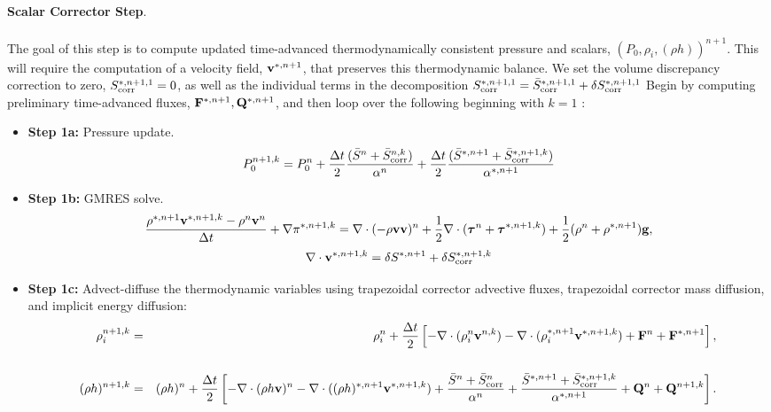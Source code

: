 \documentclass[final]{siamltex}
\def\Fb {{\bf F}}
\def\gb {{\bf g}}
\def\Qb {{\bf Q}}
\def\vb {{\bf v}}
\def\taub   {\boldsymbol{\tau}}
\begin{document}
{\bf Scalar Corrector Step}.\\ \\
The goal of this step is to compute updated time-advanced thermodynamically consistent 
pressure and scalars, $(P_0,\rho_i,(\rho h))^{n+1}$.  This will require the computation
of a velocity field, $\vb^{*,n+1}$, that preserves this thermodynamic balance.
We set the volume discrepancy correction to zero,
$S_{\rm corr}^{*,n+1,1} = 0$, as well as the individual terms in the decomposition
$S_{\rm corr}^{*,n+1,1} = \bar{S}_{\rm corr}^{*,n+1,1} + \delta S_{\rm corr}^{*,n+1,1}$
Begin by computing preliminary time-advanced fluxes, $\Fb^{*,n+1}, \Qb^{*,n+1}$,
and then loop over the following beginning with $k=1$ :\\
\begin{itemize}
\item {\bf Step 1a:} Pressure update.
\begin{equation}
P_0^{n+1,k} = P_0^n + \frac{\Delta t}{2}\frac{(\bar{S}^n + \bar{S}_{\rm corr}^{n,k})}{\alpha^n} + \frac{\Delta t}{2}\frac{(\bar{S}^{*,n+1} + \bar{S}_{\rm corr}^{*,n+1,k})}{\alpha^{*,n+1}}
\end{equation}
\item {\bf Step 1b:} GMRES solve.
\begin{equation}
\frac{\rho^{*,n+1}\vb^{*,n+1,k} - \rho^n\vb^n}{\Delta t} + \nabla\pi^{*,n+1,k} = \nabla\cdot(-\rho\vb\vb)^n + \frac{1}{2}\nabla\cdot(\taub^n + \taub^{*,n+1,k}) + \frac{1}{2}(\rho^n + \rho^{*,n+1})\gb,
\end{equation}
\begin{equation}
\nabla\cdot\vb^{*,n+1,k} = \delta S^{*,n+1} + \delta S_{\rm corr}^{*,n+1,k}
\end{equation}
\item {\bf Step 1c:} Advect-diffuse the thermodynamic variables using trapezoidal corrector advective fluxes,
trapezoidal corrector mass diffusion, and implicit energy diffusion:
\begin{eqnarray}
\rho_i^{n+1,k} &=& \rho_i^n + \frac{\Delta t}{2}\left[-\nabla\cdot(\rho_i^n\vb^{n,k}) -\nabla\cdot(\rho_i^{*,n+1}\vb^{*,n+1,k}) + \Fb^n + \Fb^{*,n+1}\right],\nonumber \\
\\
(\rho h)^{n+1,k} &=& (\rho h)^n + \frac{\Delta t}{2}\left[-\nabla\cdot(\rho h\vb)^n -\nabla\cdot((\rho h)^{*,n+1}\vb^{*,n+1,k}) + \frac{\bar{S}^n + \bar{S}_{\rm corr}^{n}}{\alpha^n} + \frac{\bar{S}^{*,n+1}+ \bar{S}_{\rm corr}^{*,n+1,k}}{\alpha^{*,n+1}} + \Qb^n + \Qb^{n+1,k}\right].\nonumber\\

\end{eqnarray}
\end{itemize}
\end{document}
